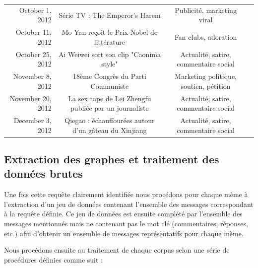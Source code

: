 \begin{landscape}
\begin{table}
\begin{tabulary}{\linewidth}{ r| C C C}
        October 1, 2012 &
        Série TV : The Emperor's Harem & 
        Publicité, marketing viral &
         \\

        October 11, 2012  &
        Mo Yan reçoit le Prix Nobel de littérature &
        Fan clubs, adoration  &
         \\

        October 25, 2012 &
        Ai Weiwei sort son clip "Caonima style"&
        Actualité, satire, commentaire social &
        \\

        November 8, 2012 &
        18ème Congrès du Parti Communiste &
        Marketing politique, soutien, pétition &
        \\

        November 20, 2012 &
        La sex tape de Lei Zhengfu publiée par un journaliste &
        Actualité, satire, commentaire social &
        \\

        December 3, 2012  &
        Qiegao : échauffourées autour d'un gâteau du Xinjiang &
        Actualité, satire, commentaire social &
        \\

    \end{tabulary}
\end{table}
\end{landscape}

\subsection{Extraction des graphes et traitement des donn\'ees brutes}
Une fois cette requ\^ete clairement identifi\'ee nous proc\'edons pour
chaque m\`eme \`a l{\textquoteright}extraction d{\textquoteright}un jeu
de donn\'ees contenant l{\textquoteright}ensemble des messages
correspondant \`a la requ\^ete d\'efinie. Ce jeu de donn\'ees est
ensuite compl\'et\'e par l{\textquoteright}ensemble des messages
mentionn\'es mais ne contenant pas le mot cl\'e (commentaires,
r\'eponses, etc.) afin d{\textquoteright}obtenir un ensemble de
messages repr\'esentatifs pour chaque m\`eme.

Nous proc\'edons ensuite au traitement de chaque corpus selon une
s\'erie de proc\'edures d\'efinies comme suit :


